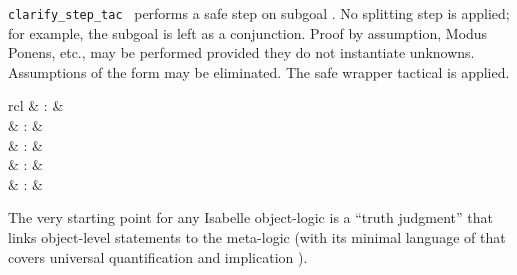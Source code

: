 \begin{isabellebody}
\begin{isamarkuptext}
\begin{description}
  \item \verb|clarify_step_tac|~ performs a safe step
  on subgoal .  No splitting step is applied; for example,
  the subgoal  is left as a conjunction.  Proof by
  assumption, Modus Ponens, etc., may be performed provided they do
  not instantiate unknowns.  Assumptions of the form 
  may be eliminated.  The safe wrapper tactical is applied.

  \end{description}%
\end{isamarkuptext}%
\isamarkuptrue%
%
\isamarkuptrue%
%
\begin{isamarkuptext}%
\begin{matharray}{rcl}
    \hypertarget{command.judgment}{\hyperlink{command.judgment}{\mbox{}}} & : &  \\
    \hypertarget{method.atomize}{\hyperlink{method.atomize}{\mbox{}}} & : &  \\
    \hypertarget{attribute.atomize}{\hyperlink{attribute.atomize}{\mbox{}}} & : &  \\
    \hypertarget{attribute.rule-format}{\hyperlink{attribute.rule-format}{\mbox{}}} & : &  \\
    \hypertarget{attribute.rulify}{\hyperlink{attribute.rulify}{\mbox{}}} & : &  \\
  \end{matharray}

  The very starting point for any Isabelle object-logic is a ``truth
  judgment'' that links object-level statements to the meta-logic
  (with its minimal language of  that covers universal
  quantification  and implication ).


\end{isamarkuptext}
\end{isabellebody}
